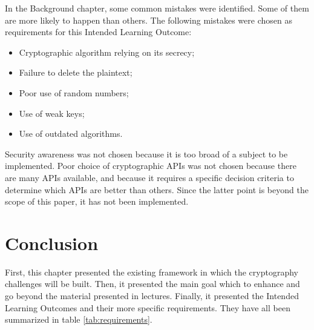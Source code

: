 \documentclass{l4proj}
\begin{document}
In the Background chapter, some common mistakes were identified. 
Some of them are more likely to happen than others.
The following mistakes were chosen as requirements for this Intended Learning Outcome:
\begin{itemize}
    \item Cryptographic algorithm relying on its secrecy;
    \item Failure to delete the plaintext;
    \item Poor use of random numbers;
    \item Use of weak keys;
    \item Use of outdated algorithms.
\end{itemize}
Security awareness was not chosen because it is too broad of a subject to be implemented. 
Poor choice of cryptographic APIs was not chosen because there are many APIs available,
and because it requires a specific decision criteria to determine which APIs are better than others.
Since the latter point is beyond the scope of this paper, it has not been implemented. 

\section{Conclusion}

First, this chapter presented the existing framework in which the cryptography challenges will be
built. Then, it presented the main goal which to enhance and go beyond the material presented in lectures.
Finally, it presented the Intended Learning Outcomes and their more specific requirements.
They have all been summarized in table \ref{tab:requirements}.
\end{document}
